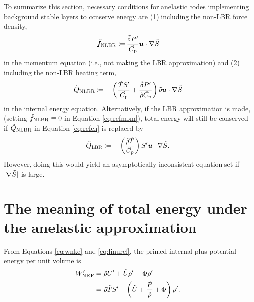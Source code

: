 \documentclass[12pt]{article}
\newcommand{\wpnke}{W^\prime_{\rm NKE}}
\newcommand{\wpheat}{W^\prime_{\rm heat}}
\newcommand{\wpcomp}{W^\prime_{\rm comp}}
\begin{document}
To summarize this section, necessary conditions for anelastic codes implementing background stable layers to conserve energy are (1) including the non-LBR force density,
\begin{align}\label{eq:nlbrmomref}
	\tilde{\bm{f}}_{\rm NLBR} \coloneqq\frac{\tilde{\delta}  {P^\prime}}{\tilde{C_{\rm{p}}}} \bm{u}\cdot \nabla\tilde{S} 
\end{align}
in the momentum equation (i.e., not making the LBR approximation) and (2) including the non-LBR heating term,
\begin{align}\label{eq:nlbrheatref}
	\tilde{Q}_{\rm NLBR} \coloneqq -  \left(\frac{\tilde{T} {S^\prime}}{\tilde{C_{\rm{p}}}} + \frac{\tilde{\delta}  {P^\prime}}{\tilde{\rho}\tilde{C_{\rm{p}}}}\right)  \tilde{\rho} \bm{u}\cdot\nabla\tilde{S}
\end{align}
in the internal energy equation. Alternatively, if the LBR approximation is made, (setting $\tilde{\bm{f}}_{\rm NLBR}\equiv0$ in Equation \eqref{eq:refmom}), total energy will still be conserved if $\tilde{Q}_{\rm NLBR}$ in Equation \eqref{eq:refen} is replaced by
\begin{align}\label{eq:lbrheating}
	\tilde{Q}_{\rm LBR}\coloneqq - \left(\frac{\tilde{\rho}\tilde{T}}{\tilde{C_{\rm{p}}}} \right) {S^\prime}\bm{u}\cdot\nabla\tilde{S}.
\end{align}
However, doing this would yield an asymptotically inconsistent equation set if $|\nabla\tilde{S}|$ is large. 


\section{The meaning of total energy under the anelastic approximation}\label{sec:meaningtote}
From Equations \eqref{eq:wnke} and \eqref{eq:linuref}, the primed internal plus potential energy per unit volume is 
\begin{align}\label{eq:perten1}
	\wpnke &=  \rhotilde U^\prime + \tilde{U}\rhoprime + \Phi \rhoprime \nonumber\\
	&= \rhotilde\tmptilde \entrprime + \left(\tilde{U}+\frac{\tilde{P}}{\rhotilde}+\Phi\right)\rhoprime.
\end{align}
\end{document}
